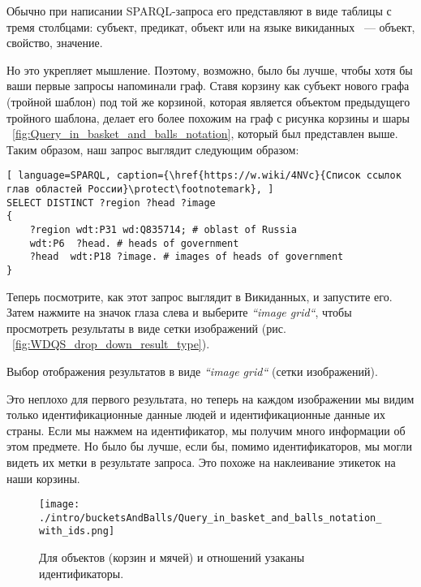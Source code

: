 Обычно при написании SPARQL-запроса его представляют в виде таблицы с тремя столбцами: субъект, предикат, объект или на языке викиданных ~--- объект, свойство, значение.

Но это укрепляет мышление. Поэтому, возможно, было бы лучше, чтобы хотя бы ваши первые запросы напоминали граф. Ставя корзину как субъект нового графа (тройной шаблон) под той же корзиной, которая является объектом предыдущего тройного шаблона, делает его более похожим на граф с рисунка корзины и шары ~\ref{fig:Query_in_basket_and_balls_notation}, который был представлен выше. Таким образом, наш запрос выглядит следующим образом:

\begin{lstlisting}[ language=SPARQL, caption={\href{https://w.wiki/4NVc}{Список ссылок глав областей России}\protect\footnotemark}, ]
SELECT DISTINCT ?region ?head ?image
{
    ?region wdt:P31 wd:Q835714; # oblast of Russia
    wdt:P6  ?head. # heads of government
    ?head  wdt:P18 ?image. # images of heads of government
}
\end{lstlisting}

\newpage Теперь посмотрите, как этот запрос выглядит в Викиданных, и запустите его. Затем нажмите на значок глаза слева и выберите \textit{``image grid``}, чтобы просмотреть результаты в виде сетки изображений (рис. ~\ref{fig:WDQS_drop_down_result_type}).

\begin{marginfigure}
	{
		\setlength{\fboxsep}{0pt}%
		\setlength{\fboxrule}{1pt}%
	}
    \caption{Выбор отображения результатов в виде \textit{``image grid``} (сетки изображений).}
	\label{fig:WDQS_drop_down_result_type}
\end{marginfigure}

Это неплохо для первого результата, но теперь на каждом изображении мы видим только идентификационные данные людей и идентификационные данные их страны. Если мы нажмем на идентификатор, мы получим много информации об этом предмете. Но было бы лучше, если бы, помимо идентификаторов, мы могли видеть их метки в результате запроса. Это похоже на наклеивание этикеток на наши корзины. 

\begin{figure*}[h!]
\texttt{[image: ./intro/bucketsAndBalls/Query\_in\_basket\_and\_balls\_notation\_with\_ids.png]}
\caption{Для объектов (корзин и мячей) и отношений узаканы идентификаторы.}
\label{fig:Query_in_basket_and_balls_notation_with_ids}
\end{figure*}

